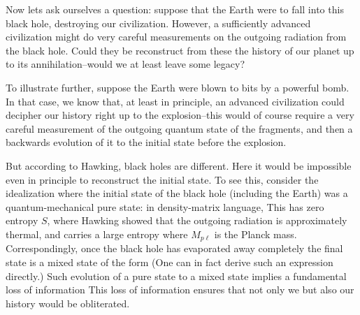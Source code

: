 
Now lets ask ourselves a question: suppose that the Earth were to fall
into this black hole, destroying our civilization. However, a
sufficiently advanced civilization might do very careful measurements on
the outgoing radiation from the black hole.  Could they be
reconstruct from these the history of our planet up to its
annihilation--would we at least leave some legacy?
%

To illustrate further, suppose the Earth were
blown to bits by a powerful
bomb. In that case, we know that, at least in principle, an advanced
civilization could decipher our history right up to the explosion--this
would of course require a very careful measurement of the outgoing
quantum state of the fragments, and then a backwards evolution of it to
the initial state before the explosion.

But according to Hawking, black holes are different. Here it would be
impossible even in principle to reconstruct the initial state. To see
this, consider the idealization where the initial state of the black
hole (including the Earth) was a quantum-mechanical pure state: in
density-matrix language,
%
\eqn{}
%
This has zero entropy ${S}$, where
%
\eqn{}
%
Hawking showed that the outgoing radiation is approximately thermal, and
carries a large entropy
%
\eqn{}
%
where ${M_{p\ell}}$ is the Planck mass. Correspondingly, once the black
hole has evaporated away completely the final state is a mixed state of
the form
%
\eqn{}
%
(One can in fact derive such an expression directly\Hawk.)
Such evolution of a pure state to a mixed state implies a fundamental
loss of information
%
\eqn{}
%
This loss of information ensures that not only we but also our history
would be obliterated.

